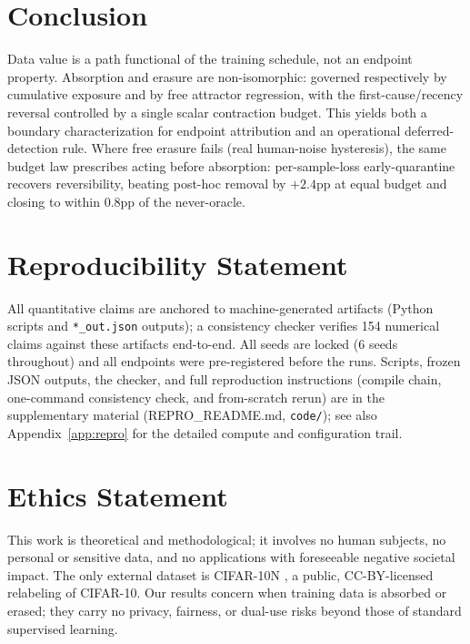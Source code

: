 \documentclass{article}
\begin{document}
\section{Conclusion}
Data value is a path functional of the training schedule, not an endpoint property. Absorption
and erasure are non-isomorphic: governed respectively by cumulative exposure and by free
attractor regression, with the first-cause/recency reversal controlled by a single scalar
contraction budget. This yields both a boundary characterization for endpoint attribution and an
operational deferred-detection rule. Where free erasure fails (real human-noise hysteresis), the
same budget law prescribes acting before absorption: per-sample-loss early-quarantine recovers
reversibility, beating post-hoc removal by $+2.4$pp at equal budget and closing to within $0.8$pp
of the never-oracle.

\section*{Reproducibility Statement}
\label{sec:reprostmt}
All quantitative claims are anchored to machine-generated artifacts (Python
scripts and \texttt{*\_out.json} outputs); a consistency checker verifies 154
numerical claims against these artifacts end-to-end. All seeds are locked (6
seeds throughout) and all endpoints were pre-registered before the runs.
Scripts, frozen JSON outputs, the checker, and full reproduction instructions
(compile chain, one-command consistency check, and from-scratch rerun) are in
the supplementary material (REPRO\_README.md, \texttt{code/}); see also
Appendix~\ref{app:repro} for the detailed compute and configuration trail.

\section*{Ethics Statement}
\label{sec:ethics}
This work is theoretical and methodological; it involves no human subjects, no
personal or sensitive data, and no applications with foreseeable negative
societal impact. The only external dataset is CIFAR-10N \citep{wei2022cifar10n},
a public, CC-BY-licensed relabeling of CIFAR-10. Our results concern when
training data is absorbed or erased; they carry no privacy, fairness, or
dual-use risks beyond those of standard supervised learning.





\end{document}
